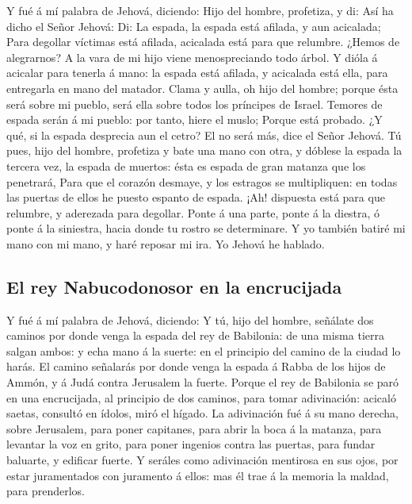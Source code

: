  Y fué á mí palabra de Jehová, diciendo:  Hijo
del hombre, profetiza, y di: Así ha dicho el Señor Jehová: Di: La
espada, la espada está afilada, y aun acicalada;  Para
degollar víctimas está afilada, acicalada está para que relumbre. ¿Hemos
de alegrarnos? A la vara de mi hijo viene menospreciando todo árbol.
 Y dióla á acicalar para tenerla á mano: la espada está
afilada, y acicalada está ella, para entregarla en mano del matador.
 Clama y aulla, oh hijo del hombre; porque ésta será sobre
mi pueblo, será ella sobre todos los príncipes de Israel. Temores de
espada serán á mi pueblo: por tanto, hiere el muslo; 
Porque está probado. ¿Y qué, si la espada desprecia aun el cetro? El no
será más, dice el Señor Jehová.  Tú pues, hijo del hombre,
profetiza y bate una mano con otra, y dóblese la espada la tercera vez,
la espada de muertos: ésta es espada de gran matanza que los penetrará,
 Para que el corazón desmaye, y los estragos se
multipliquen: en todas las puertas de ellos he puesto espanto de espada.
¡Ah! dispuesta está para que relumbre, y aderezada para degollar.
 Ponte á una parte, ponte á la diestra, ó ponte á la
siniestra, hacia donde tu rostro se determinare.  Y yo
también batiré mi mano con mi mano, y haré reposar mi ira. Yo Jehová he
hablado.

\hypertarget{el-rey-nabucodonosor-en-la-encrucijada}{%
\subsection{El rey Nabucodonosor en la
encrucijada}\label{el-rey-nabucodonosor-en-la-encrucijada}}

 Y fué á mí palabra de Jehová, diciendo:  Y
tú, hijo del hombre, señálate dos caminos por donde venga la espada del
rey de Babilonia: de una misma tierra salgan ambos: y echa mano á la
suerte: en el principio del camino de la ciudad lo harás. 
El camino señalarás por donde venga la espada á Rabba de los hijos de
Ammón, y á Judá contra Jerusalem la fuerte.  Porque el rey
de Babilonia se paró en una encrucijada, al principio de dos caminos,
para tomar adivinación: acicaló saetas, consultó en ídolos, miró el
hígado.  La adivinación fué á su mano derecha, sobre
Jerusalem, para poner capitanes, para abrir la boca á la matanza, para
levantar la voz en grito, para poner ingenios contra las puertas, para
fundar baluarte, y edificar fuerte.  Y seráles como
adivinación mentirosa en sus ojos, por estar juramentados con juramento
á ellos: mas él trae á la memoria la maldad, para prenderlos.

